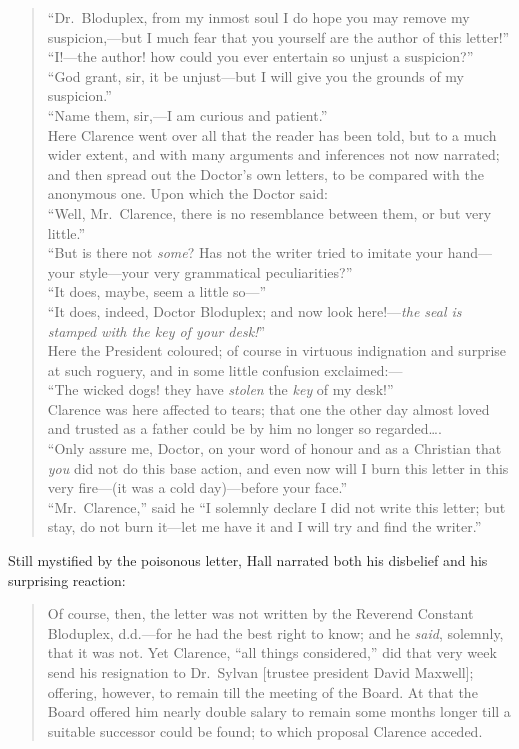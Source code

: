 \documentclass[
  american,
  letterpaper,
]{scrreprt}
\begin{document}
\begin{quote}
``Dr.~Bloduplex, from my inmost soul I do hope you may remove my
suspicion,---but I much fear that you yourself are the author of this
letter!''\\
``I!---the author! how could you ever entertain so unjust a
suspicion?''\\
``God grant, sir, it be unjust---but I will give you the grounds of my
suspicion.''\\
``Name them, sir,---I am curious and patient.''\\
Here Clarence went over all that the reader has been told, but to a much
wider extent, and with many arguments and inferences not now narrated;
and then spread out the Doctor's own letters, to be compared with the
anonymous one. Upon which the Doctor said:\\
``Well, Mr.~Clarence, there is no resemblance between them, or but very
little.''\\
``But is there not \emph{some}? Has not the writer tried to imitate your
hand---your style---your very grammatical peculiarities?''\\
``It does, maybe, seem a little so---''\\
``It does, indeed, Doctor Bloduplex; and now look here!---\emph{the seal
is stamped with the key of your desk!}''\\
Here the President coloured; of course in virtuous indignation and
surprise at such roguery, and in some little confusion exclaimed:---\\
``The wicked dogs! they have \emph{stolen} the \emph{key} of my
desk!''\\
Clarence was here affected to tears; that one the other day almost loved
and trusted as a father could be by him no longer so regarded\ldots.\\
``Only assure me, Doctor, on your word of honour and as a Christian that
\emph{you} did not do this base action, and even now will I burn this
letter in this very fire---(it was a cold day)---before your face.''\\
``Mr.~Clarence,'' said he ``I solemnly declare I did not write this
letter; but stay, do not burn it---let me have it and I will try and
find the writer.''
\end{quote}

Still mystified by the poisonous letter, Hall narrated both his
disbelief and his surprising reaction:

\begin{quote}
Of course, then, the letter was not written by the Reverend Constant
Bloduplex, d.d.---for he had the best right to know; and he \emph{said},
solemnly, that it was not. Yet Clarence, ``all things considered,'' did
that very week send his resignation to Dr.~Sylvan {[}trustee president
David Maxwell{]}; offering, however, to remain till the meeting of the
Board. At that the Board offered him nearly double salary to remain some
months longer till a suitable successor could be found; to which
proposal Clarence acceded.
\end{quote}
\end{document}
